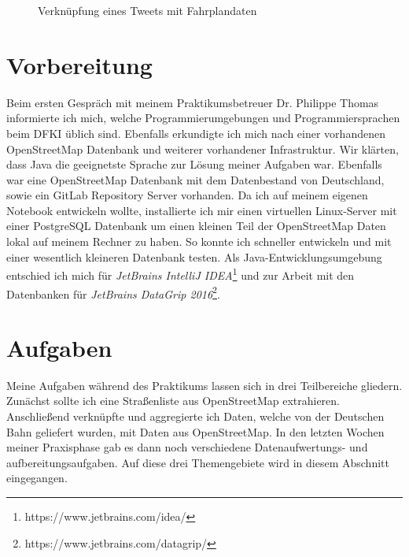 \begin{figure}
   \centering
   \caption{Verknüpfung eines Tweets mit Fahrplandaten\protect\cite{WEB:SD4M:Presentation:2016}}
   \label{fig:tweetXfahrplan}
 \end{figure}

\section{Vorbereitung}
\label{sec:main:preparation}
Beim ersten Gespräch mit meinem Praktikumsbetreuer Dr. Philippe Thomas informierte ich mich, welche Programmierumgebungen und Programmiersprachen beim DFKI üblich sind.
Ebenfalls erkundigte ich mich nach einer vorhandenen OpenStreetMap Datenbank und weiterer vorhandener Infrastruktur.
Wir klärten, dass Java die geeignetste Sprache zur Lösung meiner Aufgaben war.
Ebenfalls war eine OpenStreetMap Datenbank mit dem Datenbestand von Deutschland, sowie ein GitLab Repository Server vorhanden.
Da ich auf meinem eigenen Notebook entwickeln wollte, installierte ich mir einen virtuellen Linux-Server mit einer PostgreSQL Datenbank um einen kleinen Teil der OpenStreetMap Daten lokal auf meinem Rechner zu haben.
So konnte ich schneller entwickeln und mit einer wesentlich kleineren Datenbank testen.
Als Java-Entwicklungsumgebung entschied ich mich für \textit{JetBrains IntelliJ IDEA}\footnote{https://www.jetbrains.com/idea/} und zur Arbeit mit den Datenbanken für \textit{JetBrains DataGrip 2016}\footnote{https://www.jetbrains.com/datagrip/}.

\section{Aufgaben}
Meine Aufgaben während des Praktikums lassen sich in drei Teilbereiche gliedern. Zunächst sollte ich eine Straßenliste aus OpenStreetMap extrahieren. Anschließend verknüpfte und aggregierte ich Daten, welche von der Deutschen Bahn geliefert wurden, mit Daten aus OpenStreetMap. In den letzten Wochen meiner Praxisphase gab es dann noch verschiedene Datenaufwertungs- und aufbereitungsaufgaben. Auf diese drei Themengebiete wird in diesem Abschnitt eingegangen.

